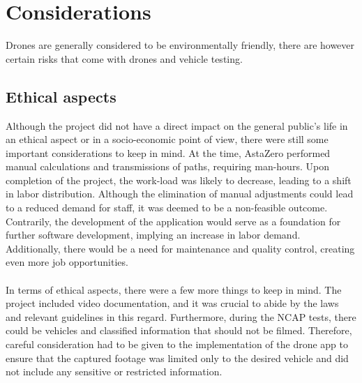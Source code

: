 \chapter{Considerations}
Drones are generally considered to be environmentally friendly, there are however certain risks that come with drones and vehicle testing.

\section{Ethical aspects}
Although the project did not have a direct impact on the general public's life in an ethical aspect or in a socio-economic point of view, there were still some important considerations to keep in mind. At the time, AstaZero performed manual calculations and transmissions of paths, requiring man-hours. Upon completion of the project, the work-load was likely to decrease, leading to a shift in labor distribution. Although the elimination of manual adjustments could lead to a reduced demand for staff, it was deemed to be a non-feasible outcome. Contrarily, the development of the application would serve as a foundation for further software development, implying an increase in labor demand. Additionally, there would be a need for maintenance and quality control, creating even more job opportunities.
\\ \\
In terms of ethical aspects, there were a few more things to keep in mind. The project included video documentation, and it was crucial to abide by the laws and relevant guidelines in this regard. Furthermore, during the NCAP tests, there could be vehicles and classified information that should not be filmed. Therefore, careful consideration had to be given to the implementation of the drone app to ensure that the captured footage was limited only to the desired vehicle and did not include any sensitive or restricted information.

